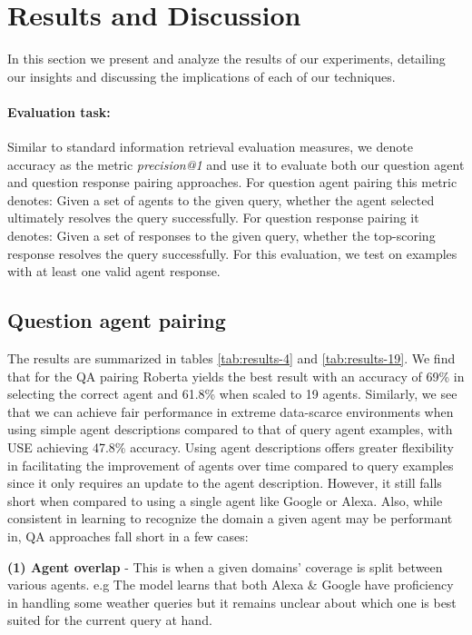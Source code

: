 \documentclass[11pt]{article}
\begin{document}
\section{Results and Discussion}

In this section we present and analyze the results of our experiments, detailing our insights and discussing the implications of each of our techniques. 

\paragraph{Evaluation task:} Similar to standard information retrieval evaluation measures, we denote accuracy as the metric \emph{precision@1} and use it to evaluate both our question agent and question response pairing approaches. For question agent pairing this metric denotes: Given a set of  agents to the given query, whether the agent selected ultimately resolves the query successfully. For question response pairing it denotes: Given a set of  responses to the given query, whether the top-scoring response resolves the query successfully. For this evaluation, we test on examples with at least one valid agent response.

\subsection{Question agent pairing} The results are summarized in tables \ref{tab:results-4} and \ref{tab:results-19}. We find that for the QA pairing Roberta yields the best result with an accuracy of 69\% in selecting the correct agent and 61.8\% when scaled to 19 agents. Similarly, we see that we can achieve fair performance in extreme data-scarce environments when using simple agent descriptions compared to that of query agent examples, with USE achieving 47.8\% accuracy. Using agent descriptions offers greater flexibility in facilitating the improvement of agents over time compared to query examples since it only requires an update to the agent description. However, it still falls short when compared to using a single agent like Google or Alexa. Also, while consistent in learning to recognize the domain a given agent may be performant in, QA approaches fall short in a few cases: 

\textbf{(1) Agent overlap} - This is when a given domains' coverage is split between various agents. e.g The model learns that both Alexa \& Google have proficiency in handling some weather queries but it remains unclear about which one is best suited for the current query at hand. 
\end{document}
